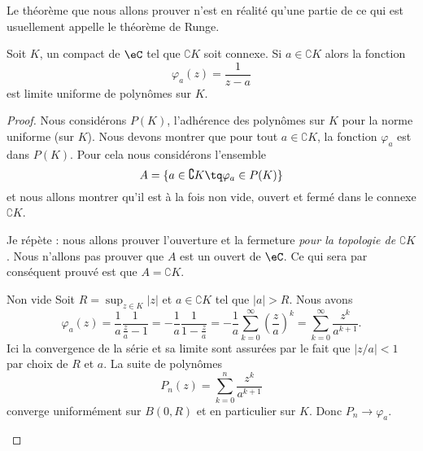 Le théorème que nous allons prouver n'est en réalité qu'une partie de ce qui est usuellement appelle le théorème de Runge.
\begin{theorem}     \label{ThoMvMCci}
    Soit \( K\), un compact de \( \eC\) tel que \( \complement K\) soit connexe. Si \( a\in \complement K\) alors la fonction 
    \begin{equation}
        \varphi_a(z)=\frac{1}{ z-a }
    \end{equation}
    est limite uniforme de polynômes sur \( K\).
\end{theorem}

\begin{proof}
    Nous considérons \( P(K)\), l'adhérence des polynômes sur \( K\) pour la norme uniforme (sur \( K\)). Nous devons montrer que pour tout \( a\in \complement K\), la fonction \( \varphi_a\) est dans \( P(K)\). Pour cela nous considérons l'ensemble
    \begin{equation}
        A=\{ a\in\complement K\tq \varphi_a\in P(K) \}
    \end{equation}
    et nous allons montrer qu'il est à la fois non vide, ouvert et fermé dans le connexe \( \complement K\).

    Je répète : nous allons prouver l'ouverture et la fermeture \emph{pour la topologie de \( \complement K\)}. Nous n'allons pas prouver que \( A\) est un ouvert de \( \eC\). Ce qui sera par conséquent prouvé est que \( A=\complement K\).

    \begin{subproof}
    \item[Non vide] Soit \( R=\sup_{z\in K}| z |\) et \( a\in \complement K\) tel que \( | a |>R\). Nous avons
        \begin{equation}
                \varphi_a(z)=\frac{1}{ a }\frac{1}{ \frac{ z }{ a }-1 }
                =-\frac{1}{ a }\frac{1}{ 1-\frac{ z }{ a } }
                =-\frac{1}{ a }\sum_{k=0}^{\infty}\left( \frac{ z }{ a } \right)^k
                =\sum_{k=0}^{\infty}\frac{ z^k }{ a^{k+1} }.
        \end{equation}
        Ici la convergence de la série et sa limite sont assurées par le fait que \( | z/a |<1\) par choix de \( R\) et \( a\). La suite de polynômes
        \begin{equation}
            P_n(z)=\sum_{k=0}^n\frac{ z^k }{ a^{k+1} }
        \end{equation}
        converge uniformément sur \( B(0,R)\) et en particulier sur \( K\). Donc \( P_n\to \varphi_a\).


\end{subproof}
\end{proof}
